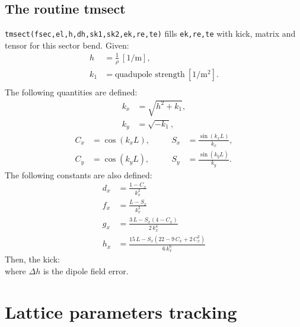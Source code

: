 \documentclass{cern-art} %
\renewcommand{\L}[1]{\lstinline[firstnumber=last]{#1}}
\begin{document}
\subsection{The routine {tmsect}}
\L{tmsect(fsec,el,h,dh,sk1,sk2,ek,re,te)} fills \L{ek,re,te} with kick, matrix and tensor for this sector bend.
Given:
\[
\begin{aligned}
h & =\frac{1}{\rho}\ \mathrm{[1/m]},\\
k_{1} & =\text{quadupole strength}\ \mathrm{[1/m^{2}]}.\\
\end{aligned}
\]
The following quantities are defined:
\[
\begin{aligned}
k_{x} & =\sqrt{h^{2}+k_{1}},\\
k_{y} & =\sqrt{-k_{1}},
\end{aligned}
\]
\[
\begin{aligned}C_{x} & =\cos(k_{x}L), & \quad & S_{x} & =\frac{\sin(k_{x}L)}{k_{x}},\\
C_{y} & =\cos(k_{y}L), & \quad & S_{y} & =\frac{\sin(k_{y}L)}{k_{y}}.
\end{aligned}
\]
The following constants are also defined:
\[
\begin{aligned}d_{x} & =\frac{1-C_{x}}{k_{x}^{2}}\\
f_{x} & =\frac{L-S_{x}}{k_{x}^{2}}\\
g_{x} & =\frac{3\, L-S_{x}\left(4-C_{x}\right)}{2\, k_{x}^{4}}\\
h_{x} & =\frac{15\, L-S_{x}\left(22-9\, C_{x}+2\, C_{x}^{2}\right)}{6\, k_{x}^{6}}
\end{aligned}
\]
Then, the kick:
\\where $\Delta h$ is the dipole field error.







\section{Lattice parameters tracking}
\end{document}
